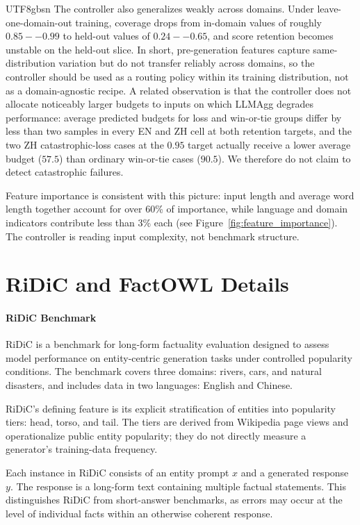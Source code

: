 \documentclass[11pt]{article}
\begin{document}
\begin{CJK*}{UTF8}{gbsn}
The controller also generalizes weakly across domains. Under leave-one-domain-out training, coverage drops from in-domain values of roughly $0.85--0.99$ to held-out values of $0.24--0.65$, and score retention becomes unstable on the held-out slice. In short, pre-generation features capture same-distribution variation but do not transfer reliably across domains, so the controller should be used as a routing policy within its training distribution, not as a domain-agnostic recipe. A related observation is that the controller does not allocate noticeably larger budgets to inputs on which LLMAgg degrades performance: average predicted budgets for loss and win-or-tie groups differ by less than two samples in every EN and ZH cell at both retention targets, and the two ZH catastrophic-loss cases at the $0.95$ target actually receive a lower average budget ($57.5$) than ordinary win-or-tie cases ($90.5$). We therefore do not claim to detect catastrophic failures.

Feature importance is consistent with this picture: input length and average word length together account for over 60\% of importance, while language and domain indicators contribute less than 3\% each (see Figure~\ref{fig:feature_importance}). The controller is reading input complexity, not benchmark structure.

\section{RiDiC and FactOWL Details}

\paragraph{RiDiC Benchmark}

RiDiC is a benchmark for long-form factuality evaluation designed 
to assess model performance on entity-centric generation tasks 
under controlled popularity conditions. The benchmark covers three 
domains: rivers, cars, and natural disasters, and includes data in 
two languages: English and Chinese.

RiDiC's defining feature is its explicit stratification of entities into popularity tiers: head, torso, and tail. The tiers are derived from Wikipedia page views and operationalize public entity popularity; they do not directly measure a generator's training-data frequency.

Each instance in RiDiC consists of an entity prompt $x$ and a generated 
response $y$. The response is a long-form text containing multiple 
factual statements. This distinguishes RiDiC from short-answer 
benchmarks, as errors may occur at the level of individual facts 
within an otherwise coherent response.


\end{CJK*}
\end{document}
